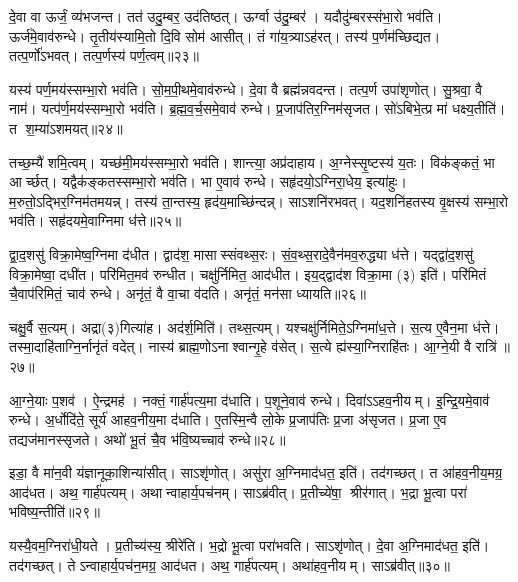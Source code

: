 दे॒वा वा ऊर्जं॒ व्य॑भजन्त। तत॑ उदु॒म्बर॒ उद॑तिष्ठत्। ऊर्ग्वा उ॑दु॒म्बर॑। यदौदु॑म्बरस्संभा॒रो भव॑ति। ऊर्ज॑मे॒वाव॑रुन्धे। तृ॒तीय॑स्यामि॒तो दि॒वि सोम॑ आसीत्। तं गा॑य॒त्र्याऽह॑रत्। तस्य॑ प॒र्णम॑च्छिद्यत। तत्प॒र्णो॑ऽभवत्। तत्प॒र्णस्य॑ पर्ण॒त्वम्॥२३॥

यस्य॑ पर्ण॒मय॑स्सम्भा॒रो भव॑ति। सो॒म॒पी॒थमे॒वाव॑रुन्धे। दे॒वा वै ब्रह्म॑न्नवदन्त। तत्प॒र्ण उपा॑शृणोत्। सु॒श्रवा॒ वै नाम॑। यत्प॑र्ण॒मय॑स्सम्भा॒रो भव॑ति। ब्र॒ह्म॒व॒र्च॒समे॒वाव॑ रुन्धे। प्र॒जाप॑तिर॒ग्निम॑सृजत। सो॑ऽबिभे॒त्प्र मा॑ धक्ष्य॒तीति॑। त श॒म्या॑ऽशमयत्॥२४॥

तच्छ॒म्यै॑ शमि॒त्वम्। यच्छ॑मी॒मय॑स्सम्भा॒रो भव॑ति। शान्त्या॒ अप्र॑दाहाय। अ॒ग्नेस्सृ॒ष्टस्य॑ य॒तः। विक॑ङ्कतं॒ भा आर्च्छत्। यद्वैक॑ङ्कतस्सम्भा॒रो भव॑ति। भा ए॒वाव॑ रुन्धे। सहृ॑दयो॒ऽग्निरा॒धेय॒ इत्या॑हुः। म॒रुतो॒ऽद्भिर॒ग्निम॑तमयन्न्। तस्य॑ ता॒न्तस्य॒ हृद॑य॒माच्छि॑न्दन्न्। साऽशनि॑रभवत्। यद॒शनि॑हतस्य वृ॒क्षस्य॑ सम्भा॒रो भव॑ति। सहृ॑दयमे॒वाग्निमा ध॑त्ते॥२५॥

द्वा॒द॒शसु॑ विक्रा॒मेष्व॒ग्निमा द॑धीत। द्वाद॑श॒ मासास्संवथ्स॒रः। सं॒व॒थ्स॒रादे॒वैन॑मव॒रुद्ध्या ध॑त्ते। यद्द्वा॑द॒शसु॑ विक्रा॒मेष्वा॒ दधी॑त। परि॑मित॒मव॑ रुन्धीत। चक्षु॑र्निमित॒ आद॑धीत। इय॒द्द्वाद॑श विक्रा॒मा (३) इति॑। परि॑मितं चै॒वाप॑रिमितं॒ चाव॑ रुन्धे। अनृ॑तं॒ वै वा॒चा व॑दति। अनृ॑तं॒ मन॑सा ध्यायति॥२६॥

चक्षु॒र्वै स॒त्यम्। अद्रा(३)गित्या॑ह। अद॑र्\mbox{}श॒मिति॑। तथ्स॒त्यम्। यश्चक्षु॑र्निमिते॒ऽग्निमा॑ध॒त्ते। स॒त्य ए॒वैन॒मा ध॑त्ते। तस्मा॒दाहि॑ताग्नि॒र्नानृ॑तं वदेत्। नास्य॑ ब्राह्म॒णोऽनाश्वान्गृ॒हे व॑सेत्। स॒त्ये ह्य॑स्या॒ग्निराहि॑तः। आ॒ग्ने॒यी वै रात्रि॑॥२७॥

आ॒ग्ने॒याः प॒शव॑। ऐ॒न्द्रमह॑। नक्तं॒ गार्\mbox{}ह॑पत्य॒मा द॑धाति। प॒शूने॒वाव॑ रुन्धे। दिवा॑ऽऽहव॒नीयम्। इ॒न्द्रि॒यमे॒वाव॑ रुन्धे। अ॒र्धोदि॑ते॒ सूर्य॑ आहव॒नीय॒मा द॑धाति। ए॒तस्मि॒न्वै लो॒के प्र॒जाप॑तिः प्र॒जा अ॑सृजत। प्र॒जा ए॒व तद्यज॑मानस्सृजते। अथो॑ भू॒तं चै॒व भ॑वि॒ष्यच्चाव॑ रुन्धे॥२८॥

इडा॒ वै मा॑न॒वी य॑ज्ञानूका॒शिन्या॑सीत्। साऽशृ॑णोत्। असु॑रा अ॒ग्निमाद॑धत॒ इति॑। तद॑गच्छत्। त आ॑हव॒नीय॒मग्र॒ आद॑धत। अथ॒ गार्\mbox{}ह॑पत्यम्। अथान्वाहार्य॒पच॑नम्। साऽब्र॑वीत्। प्र॒तीच्ये॑षा॒ श्रीर॑गात्। भ॒द्रा भू॒त्वा परा॑ भविष्य॒न्तीति॑॥२९॥

यस्यै॒वम॒ग्निरा॑धी॒यते। प्र॒तीच्य॑स्य॒ श्रीरे॑ति। भ॒द्रो भू॒त्वा परा॑भवति। साऽशृ॑णोत्। दे॒वा अ॒ग्निमाद॑धत॒ इति॑। तद॑गच्छत्। तेऽन्वाहार्य॒पच॑न॒मग्र॒ आद॑धत। अथ॒ गार्\mbox{}ह॑पत्यम्। अथा॑हव॒नीयम्। साऽब्र॑वीत्॥३०॥

